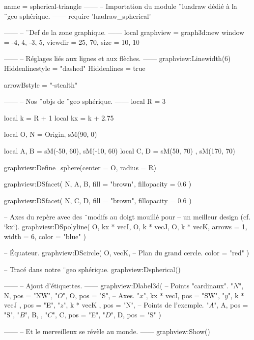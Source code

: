\documentclass{standalone}
\begin{document}
\begin{luadraw}{name = spherical-triangle}
------
-- Importation du module ¨luadraw dédié à la ¨geo sphérique.
------
require 'luadraw_spherical'

------
-- ¨Def de la zone graphique.
------
local graphview = graph3d:new{
  window  = {-4, 4, -3, 5},
  viewdir = {25, 70},
  size    = {10, 10}
}

------
-- Réglages liés aux lignes et aux flèches.
------
graphview:Linewidth(6)
Hiddenlinestyle = "dashed"
Hiddenlines     = true

arrowBstyle = "-stealth"

------
-- Nos ¨objs de ¨geo sphérique.
------
local R =  3

local k  = R + 1
local kx = k + 2.75

local O, N = Origin, sM(90, 0)

local A, B = sM(-50, 60), sM(-10, 60)
local C, D = sM(50, 70) , sM(170, 70)

graphview:Define_sphere({center = O, radius = R})

graphview:DSfacet(
  {N, A, B},
  {fill = "brown", fillopacity = 0.6}
)

graphview:DSfacet(
  {N, C, D},
  {fill = "brown", fillopacity = 0.6}
)

-- Axes du repère avec des ¨modifs au doigt mouillé pour
-- un meilleur design (cf. `kx`).
graphview:DSpolyline(
  {
    {O, kx * vecI},
    {O, k * vecJ},
    {O, k * vecK}},
    {arrows = 1, width = 6, color = "blue"}
)

-- Équateur.
graphview:DScircle(
  {O, vecK},       -- Plan du grand cercle.
  {color = "red"}
)

-- Tracé dans notre ¨geo sphérique.
graphview:Dspherical()

------
-- Ajout d'étiquettes.
------
graphview:Dlabel3d(
-- Points "cardinaux".
  "$N$", N, {pos = "NW"},
  "$O$", O, {pos = "S"},
-- Axes.
  "$x$", kx * vecI, {pos = "SW"},
  "$y$", k * vecJ , {pos = "E"},
  "$z$", k * vecK , {pos = "N"},
-- Points de l'exemple.
  "$A$", A, {pos = "S"},
  "$B$", B, {},
  "$C$", C, {pos = "E"},
  "$D$", D, {pos = "S"}
)

------
-- Et le merveilleux se révèle au monde.
------
graphview:Show()
\end{luadraw}
\end{document}
